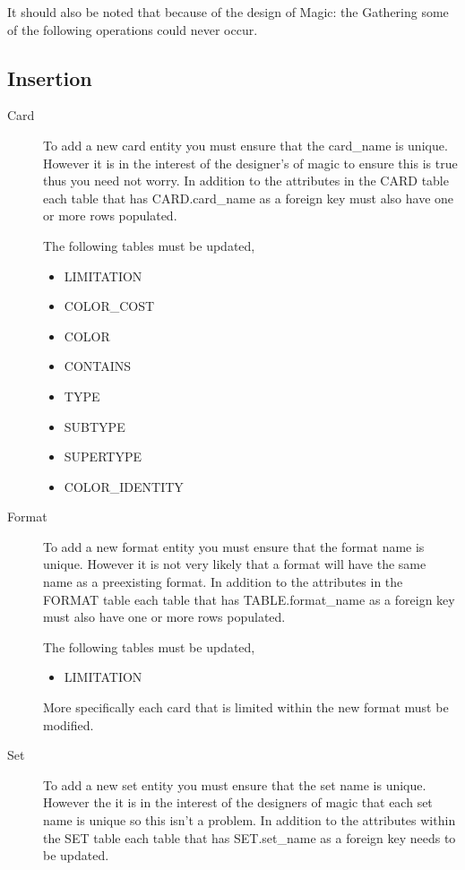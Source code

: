 \documentclass{article}
\begin{document}
\bigskip
It should also be noted that because of the design of Magic: the Gathering some of the following operations could never occur.
\subsection{Insertion}
\begin{description}
    \item[Card]
        To add a new card entity you must ensure that the card\_name is unique.
        However it is in the interest of the designer's of magic to ensure this is true thus you need not worry.
        In addition to the attributes in the CARD table each table that has CARD.card\_name as a foreign key must also have one or more rows populated.

        The following tables must be updated,
        \begin{multicols}{3}
            \begin{itemize}
                \item LIMITATION
                \item COLOR\_COST
                \item COLOR
                \item CONTAINS
                \item TYPE
                \item SUBTYPE
                \item SUPERTYPE
                \item COLOR\_IDENTITY
            \end{itemize}
        \end{multicols}
    \item[Format]
        To add a new format entity you must ensure that the format name is unique.
        However it is not very likely that a format will have the same name as a preexisting format.
        In addition to the attributes in the FORMAT table each table that has TABLE.format\_name as a foreign key must also have one or more rows populated.

        The following tables must be updated,
        \begin{multicols}{3}
            \begin{itemize}
                \item LIMITATION
            \end{itemize}
        \end{multicols}
        More specifically each card that is limited within the new format must be modified.
    \item[Set]
        To add a new set entity you must ensure that the set name is unique.
        However the it is in the interest of the designers of magic that each set name is unique so this isn't a problem.
        In addition to the attributes within the SET table each table that has SET.set\_name as a foreign key needs to be updated.


\end{description}
\end{document}
